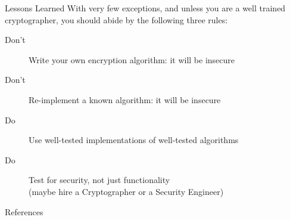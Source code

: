 \documentclass[style=sailor, mode=present]{powerdot}
\begin{document}
\begin{slide}{Lessons Learned}
\pause
With very few exceptions, and unless you are a well trained cryptographer, you should abide by the following three rules:

\begin{description}
\item[Don't] Write your own encryption algorithm: it will be insecure \pause
\item[Don't] Re-implement a known algorithm: it will be insecure \pause
\item [Do\phantom{n't}] Use well-tested implementations of well-tested algorithms \pause
\item [Do\phantom{n't}] Test for security, not just functionality\\\hspace{30pt}(maybe hire a Cryptographer or a Security Engineer)
\end{description}
\end{slide}

\begin{slide}[toc=]{References}
\printbibliography
\end{slide}
\end{document}
